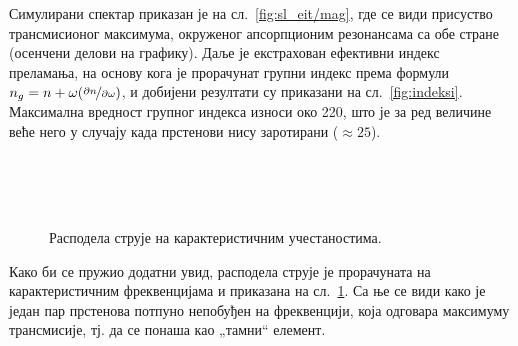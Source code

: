 \documentclass[main.tex]{subfiles}
\begin{document}
Симулирани спектар приказан је на сл.~\ref{fig:sl_eit/mag}, где се види присуство трансмисионог максимума, окруженог апсорпционим резонансама са обе стране (осенчени делови на графику). Даље је екстрахован ефективни индекс преламања, на основу кога је прорачунат групни индекс према формули $n_g = n + \omega(\nicefrac{\partial n}{\partial \omega})$, и добијени резултати су приказани на сл.~\ref{fig:indeksi}. Максимална вредност групног индекса износи око 220, што је за ред величине веће него у случају када прстенови нису заротирани ($\approx 25$).

\begin{figure}[h!]
    \centering
    \\
    \\
    \\
    \caption{Расподела струје на карактеристичним учестаностима.}
    \label{fig:sl_eit/str1}
\end{figure}
Како би се пружио додатни увид, расподела струје је прорачуната на карактеристичним фреквенцијама и приказана на сл.~\ref{fig:sl_eit/str1}. Са ње се види како је један пар прстенова потпуно непобуђен на фреквенцији, која одговара максимуму трансмисије, тј. да се понаша као „тамни`` елемент.
\end{document}

